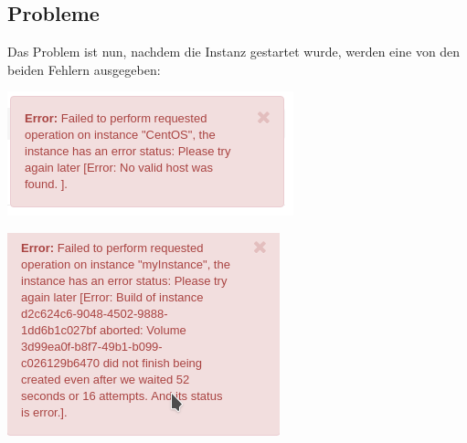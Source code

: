 \subsection{Probleme}
Das Problem ist nun, nachdem die Instanz gestartet wurde, werden eine von den beiden Fehlern ausgegeben:

\begin{minipage}{\linewidth}
	\centering
	\includegraphics[width=0.6\linewidth]{images/error}
\end{minipage}

\begin{minipage}{\linewidth}
	\centering
	\includegraphics[width=0.6\linewidth]{images/error2}
\end{minipage}


